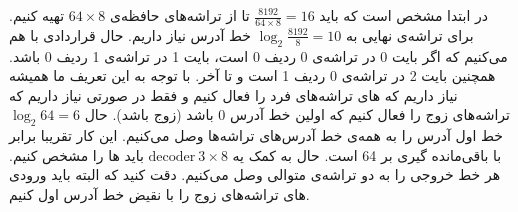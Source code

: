 در ابتدا مشخص است که باید
$\frac{8192}{64 \times 8} = 16$
تا از تراشه‌های حافظه‌ی
$64 \times 8$
تهیه کنیم.
برای تراشه‌ی نهایی به
$\log_2 \frac{8192}{8} = 10$
خط آدرس نیاز داریم.
حال قراردادی با هم می‌کنیم که اگر بایت 0 در تراشه‌ی 0 ردیف 0 است، بایت 1 در تراشه‌ی 1 ردیف 0 باشد.
همچنین بایت 2 در تراشه‌ی 0 ردیف 1 است و تا آخر.
با توجه به این تعریف ما همیشه نیاز داریم که
‌های
تراشه‌های فرد را فعال کنیم و فقط در صورتی نیاز داریم که
تراشه‌های زوج را فعال کنیم که اولین خط آدرس 0 باشد (زوج باشد).
حال
$\log_2 64 = 6$
خط اول آدرس را به همه‌ی خط آدرس‌های تراشه‌ها وصل می‌کنیم.
این کار تقریبا برابر با باقی‌مانده گیری بر 64 است.
حال به کمک یه
$\text{decoder} \ 3 \times 8$
باید
ها
را مشخص کنیم.
هر خط خروجی
را به
دو تراشه‌ی متوالی وصل می‌کنیم.
دقت کنید که البته باید ورودی
های
تراشه‌های زوج را با نقیض خط آدرس اول
کنیم.
\\